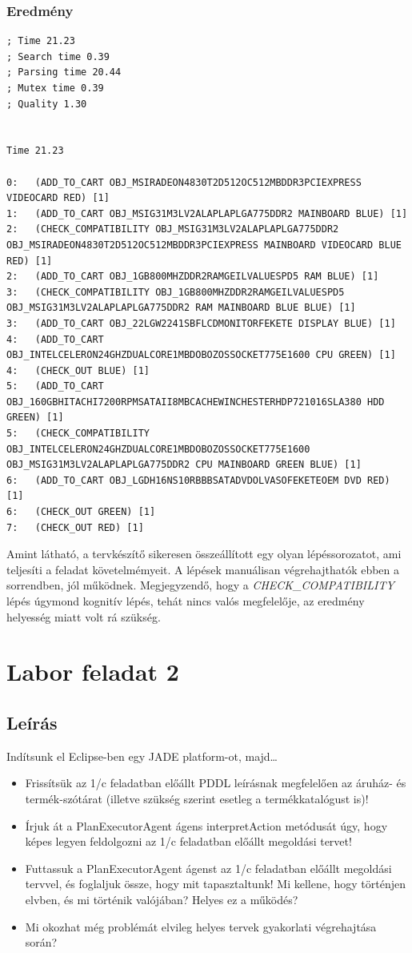\subsubsection{Eredmény}
\begin{lstlisting}[frame=single,float=!ht]	
; Time 21.23
; Search time 0.39
; Parsing time 20.44
; Mutex time 0.39
; Quality 1.30


Time 21.23

0:   (ADD_TO_CART OBJ_MSIRADEON4830T2D512OC512MBDDR3PCIEXPRESS VIDEOCARD RED) [1]
1:   (ADD_TO_CART OBJ_MSIG31M3LV2ALAPLAPLGA775DDR2 MAINBOARD BLUE) [1]
2:   (CHECK_COMPATIBILITY OBJ_MSIG31M3LV2ALAPLAPLGA775DDR2 
OBJ_MSIRADEON4830T2D512OC512MBDDR3PCIEXPRESS MAINBOARD VIDEOCARD BLUE RED) [1]
2:   (ADD_TO_CART OBJ_1GB800MHZDDR2RAMGEILVALUESPD5 RAM BLUE) [1]
3:   (CHECK_COMPATIBILITY OBJ_1GB800MHZDDR2RAMGEILVALUESPD5 
OBJ_MSIG31M3LV2ALAPLAPLGA775DDR2 RAM MAINBOARD BLUE BLUE) [1]
3:   (ADD_TO_CART OBJ_22LGW2241SBFLCDMONITORFEKETE DISPLAY BLUE) [1]
4:   (ADD_TO_CART OBJ_INTELCELERON24GHZDUALCORE1MBDOBOZOSSOCKET775E1600 CPU GREEN) [1]
4:   (CHECK_OUT BLUE) [1]
5:   (ADD_TO_CART OBJ_160GBHITACHI7200RPMSATAII8MBCACHEWINCHESTERHDP721016SLA380 HDD GREEN) [1]
5:   (CHECK_COMPATIBILITY OBJ_INTELCELERON24GHZDUALCORE1MBDOBOZOSSOCKET775E1600 
OBJ_MSIG31M3LV2ALAPLAPLGA775DDR2 CPU MAINBOARD GREEN BLUE) [1]
6:   (ADD_TO_CART OBJ_LGDH16NS10RBBBSATADVDOLVASOFEKETEOEM DVD RED) [1]
6:   (CHECK_OUT GREEN) [1]
7:   (CHECK_OUT RED) [1]
\end{lstlisting}
Amint látható, a tervkészítő sikeresen összeállított egy olyan lépéssorozatot, ami teljesíti a feladat követelmémyeit. A lépések manuálisan végrehajthatók ebben a sorrendben, jól működnek. Megjegyzendő, hogy a \emph{CHECK\_COMPATIBILITY} lépés úgymond kognitív lépés, tehát nincs valós megfelelője, az eredmény helyesség miatt volt rá szükség.

\section{Labor feladat 2}
\subsection{Leírás}
Indítsunk el Eclipse-ben egy JADE platform-ot, majd… 
\begin{itemize}
\item Frissítsük az 1/c feladatban előállt PDDL leírásnak megfelelően az áruház- és termék-szótárat (illetve szükség szerint esetleg a termékkatalógust is)! 
\item Írjuk át a PlanExecutorAgent ágens interpretAction metódusát úgy, hogy képes legyen feldolgozni az 1/c feladatban előállt megoldási tervet! 
\item Futtassuk a PlanExecutorAgent ágenst az 1/c feladatban előállt megoldási tervvel, és foglaljuk össze, hogy mit tapasztaltunk! Mi kellene, hogy történjen elvben, és mi történik valójában? Helyes ez a működés? 
\item Mi okozhat még problémát elvileg helyes tervek gyakorlati végrehajtása során?
\end{itemize}
